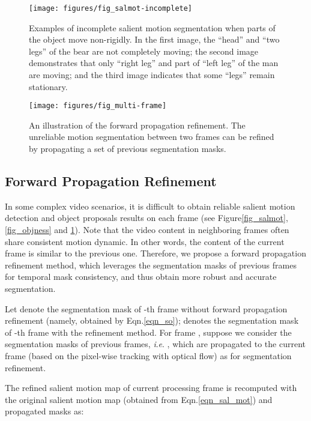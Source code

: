 \documentclass[journal]{IEEEtran}
\makeatletter
\newcommand{\ie}{\textit{i}.\textit{e}. }
\newcommand{\fig}{{Figure}\@\xspace}
\newcommand{\eqn}{{Eqn.}\@\xspace}
\makeatother
\begin{document}
\begin{figure}[t]
	\centerline{\texttt{[image: figures/fig\_salmot-incomplete]}}
	\caption{Examples of incomplete salient motion segmentation when parts of the object move non-rigidly.
In the first image, the ``head'' and ``two legs'' of the bear are not completely moving; the second image demonstrates that only ``right leg'' and part of ``left leg'' of the man are moving; and the third image indicates that some ``legs'' remain stationary.}
	\label{fig_salmot-incomplete}
\end{figure} 
\begin{figure}[!t]
	\centerline{\texttt{[image: figures/fig\_multi-frame]}}
	\caption{An illustration of the forward propagation refinement. 
		The unreliable motion segmentation between two frames can be refined by propagating a set of previous segmentation masks.}
	\label{fig_multi-frame}
\end{figure}   
\subsection{Forward Propagation Refinement}
\label{subsec_multi-frame}
In some complex video scenarios, it is difficult to obtain reliable salient motion detection and object proposals results on each frame 
(see \fig \ref{fig_salmot}, \ref{fig_objness} and \ref{fig_salmot-incomplete}).
Note that the video content in neighboring frames often share consistent motion dynamic. In other words, the content of the current frame is similar to the previous one. Therefore, we propose a forward propagation refinement method, which leverages the segmentation masks of previous frames for temporal mask consistency, and thus obtain more robust and accurate segmentation. 

Let {\small } denote the segmentation mask of -th frame without forward propagation refinement (namely, obtained by \eqn \ref{eqn_so}); {\small } denotes the segmentation mask of -th frame with the refinement method. For frame {\small }, suppose we consider the segmentation masks of previous  frames, \ie {\small }, which are propagated to the current frame (based on the pixel-wise tracking with optical flow) as {\small } for segmentation refinement. 

The refined salient motion map {\small } of current processing frame is recomputed with the original salient motion map {\small } (obtained from \eqn \ref{eqn_sal_mot}) and propagated masks {\small } as:
\end{document}
